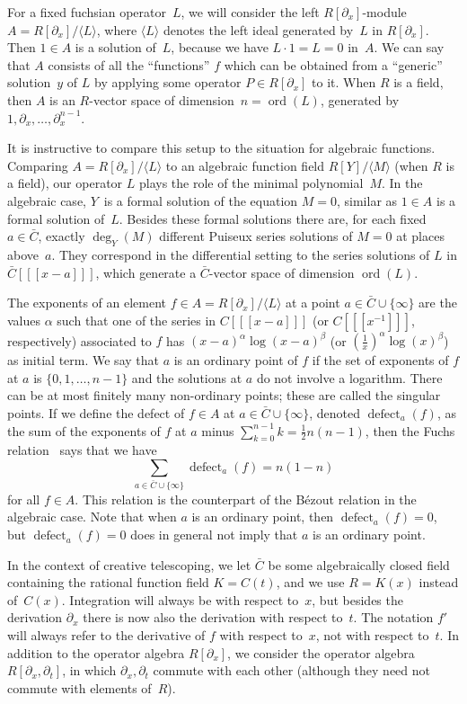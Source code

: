 \documentclass[final,1p,times,authoryear]{elsarticle}
\def\ord{\operatorname{ord}}
\def\<#1>{\langle#1\rangle}
\def\defect{\operatorname{defect}}
\begin{document}
For a fixed fuchsian operator~$L$, we will consider the left $R[\partial_x]$-module
$A=R[\partial_x]/\<L>$, where $\<L>$ denotes the left ideal generated by~$L$ in
$R[\partial_x]$.  Then $1\in A$ is a solution of~$L$, because we have $L\cdot 1=L=0$
in~$A$. We can say that $A$ consists of all the ``functions'' $f$ which can be
obtained from a ``generic'' solution~$y$ of $L$ by applying some operator $P\in
R[\partial_x]$ to it. When $R$ is a field, then $A$ is an $R$-vector space of
dimension~$n=\ord(L)$, generated by $1,\partial_x,\dots,\partial_x^{n-1}$.

It is instructive to compare this setup to the situation for algebraic
functions. Comparing $A=R[\partial_x]/\<L>$ to an algebraic function field $R[Y]/\<M>$
(when $R$ is a field), our operator $L$ plays the role of the minimal
polynomial~$M$. In the algebraic case, $Y$~is a formal solution of the equation
$M=0$, similar as $1\in A$ is a formal solution of~$L$. Besides these formal
solutions there are, for each fixed $a\in\bar C$, exactly $\deg_Y(M)$ different
Puiseux series solutions of $M=0$ at places above~$a$. They correspond in the
differential setting to the series solutions of $L$ in $\bar C[[[x-a]]]$, which
generate a $\bar C$-vector space of dimension $\ord(L)$.

The exponents of an element $f\in A=R[\partial_x]/\<L>$ at a point $a\in\bar C\cup\{\infty\}$
are the values $\alpha$ such that one of the series in $C[[[x-a]]]$ (or $C[[[x^{-1}]]]$, respectively)
associated to $f$ has $(x-a)^\alpha\log(x-a)^\beta$ (or $(\frac1x)^\alpha\log(x)^\beta$) as initial
term. We say that $a$ is an ordinary point of $f$ if the set of exponents of $f$ at $a$ is $\{0,1,\dots,n-1\}$
and the solutions at $a$ do not involve a logarithm.
There can be at most finitely many non-ordinary points; these are called the singular points. If we define
the defect of $f\in A$ at $a\in\bar C\cup\{\infty\}$, denoted $\defect_a(f)$,
as the sum of the exponents of $f$ at $a$ minus
$\sum_{k=0}^{n-1}k=\frac12n(n-1)$, then the Fuchs relation~\citep{schlesinger95,ince26} says that we have
\[
 \sum_{a\in\bar C\cup\{\infty\}} \defect_a(f) = n(1-n)
\]
for all $f\in A$. This relation is the counterpart of the B\'{e}zout relation in the algebraic case.
Note that when $a$ is an ordinary point, then $\defect_a(f)=0$, but $\defect_a(f)=0$ does in
general not imply that $a$ is an ordinary point.

In the context of creative telescoping, we let $\bar C$ be some algebraically
closed field containing the rational function field $K=C(t)$, and we
use $R=K(x)$ instead of~$C(x)$. Integration will always be with respect to~$x$, but
besides the derivation $\partial_x$ there is now also the derivation with respect
to~$t$. The notation $f'$ will always refer to the derivative of $f$
with respect to~$x$, not with respect to~$t$. In addition to the operator
algebra $R[\partial_x]$, we consider the
operator algebra $R[\partial_x,\partial_t]$, in which $\partial_x,\partial_t$
commute with each other (although they need not commute with elements of~$R$).
\end{document}
